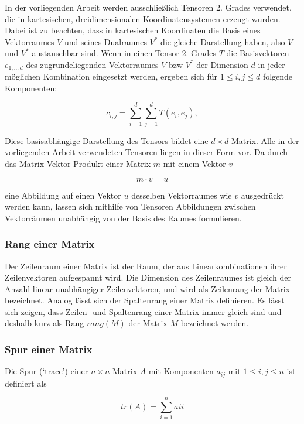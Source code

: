 \documentclass[a4paper,fontsize=12pt,toc=bib,halfparskip]{scrartcl}
\begin{document}
In der vorliegenden Arbeit werden ausschlie{\ss}lich Tensoren 2. Grades verwendet, die in kartesischen, dreidimensionalen Koordinatensystemen erzeugt wurden. Dabei ist zu beachten, dass in kartesischen Koordinaten die Basis eines Vektorraumes $V$ und seines Dualraumes $V^*$ die gleiche Darstellung haben, also $V$ und $V^*$ austauschbar sind. Wenn in einen Tensor 2. Grades $T$ die Basisvektoren $e_{1,..,d}$ des zugrundeliegenden Vektorraumes $V$ bzw $V^*$ der Dimension $d$ in jeder m\"oglichen Kombination eingesetzt werden, ergeben sich f\"ur $1\leq i,j\leq d$ folgende Komponenten:

\begin{equation}
	c_{i,j} = \sum_{i=1}^{d} \sum_{j=1}^{d} T(e_i, e_j),  
\end{equation}

Diese basisabh\"angige Darstellung des Tensors bildet eine $d\times d$ Matrix. Alle in der vorliegenden Arbeit verwendeten Tensoren liegen in dieser Form vor. Da durch das Matrix-Vektor-Produkt einer Matrix $m$ mit einem Vektor $v$

\begin{equation}
	m \cdot v = u
\end{equation} 

eine Abbildung auf einen Vektor $u$ desselben Vektorraumes wie $v$ ausgedr\"uckt werden kann, lassen sich mithilfe von Tensoren Abbildungen zwischen Vektorr\"aumen unabh\"angig von der Basis des Raumes formulieren.

\subsubsection{Rang einer Matrix}
Der Zeilenraum einer Matrix ist der Raum, der aus Linearkombinationen ihrer Zeilenvektoren aufgespannt wird. Die Dimension des Zeilenraumes ist gleich der Anzahl linear unabh\"angiger Zeilenvektoren, und wird als Zeilenrang der Matrix bezeichnet. Analog l\"asst sich der Spaltenrang einer Matrix definieren. Es l\"asst sich zeigen, dass Zeilen- und Spaltenrang einer Matrix immer gleich sind und deshalb kurz als Rang $rang(M)$ der Matrix $M$ bezeichnet werden.

\subsubsection{Spur einer Matrix}
Die Spur (`trace') einer $n\times n$ Matrix $A$ mit Komponenten $a_{ij}$ mit $1 \leq i,j \leq n$ ist definiert als

\begin{equation}
	tr(A) = \sum_{i = 1}^{n} a{ii}
\end{equation}
\end{document}
